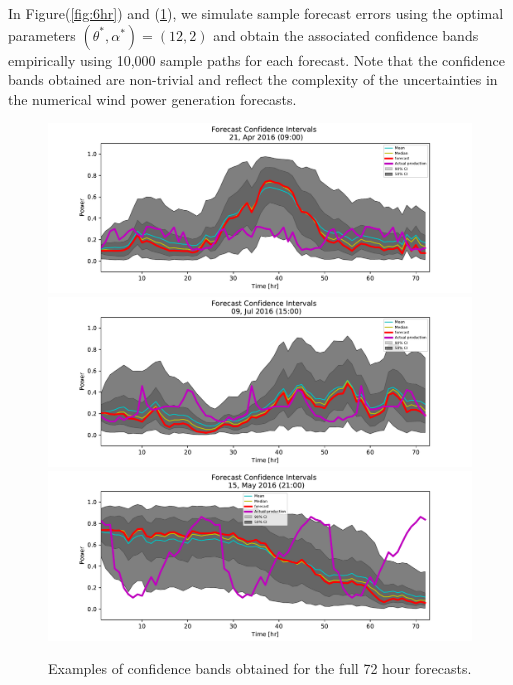 \documentclass[10pt,twocolumn,letterpaper]{article}
\begin{document}
 
 
In Figure(\ref{fig:6hr}) and (\ref{fig:72hr}), we simulate sample forecast errors using the optimal parameters  $(\theta^*, \alpha^*)= (12,2)$ and obtain the associated confidence bands empirically using 10,000 sample paths for each forecast. Note that the confidence bands obtained are non-trivial and reflect the complexity of the uncertainties in the numerical wind power generation forecasts.

\begin{figure}[t]
\begin{center}
   \includegraphics[width=0.9\linewidth]{72hr_forecast_CI_343.pdf}
   \includegraphics[width=0.9\linewidth]{72hr_forecast_CI_573.pdf}
   \includegraphics[width=0.9\linewidth]{72hr_forecast_CI_396.pdf}

\end{center}
   \caption{ Examples of confidence bands obtained for the full 72 hour forecasts. }
\label{fig:72hr}
\end{figure}
\end{document}

